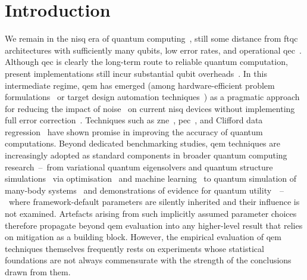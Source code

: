 \documentclass[10pt,conference]{IEEEtran}
\begin{document}
\section{Introduction}
\label{sec:introduction}
We remain in the \gls{nisq} era of quantum computing~\cite{preskill_quantum_2018,felix:23:imperfections,simon:24:noise,bharti:2022}, still some distance from \gls{ftqc} architectures with sufficiently many qubits, low error rates, and operational \gls{qec}~\cite{preskill_fault-tolerant_1997,preskill_beyond_2025}. Although \gls{qec} is clearly the long-term route to reliable quantum computation, present implementations still incur substantial qubit overheads~\cite{beverland_surface_2022,gidney_yoked_2023}. In this intermediate regime, \gls{qem} has emerged (among hardware-efficient problem formulations~\cite{lukas:25:sat,lukas:24:reduction,schmidbauer:2026} or target design automation techniques~\cite{simon:25:designautomation,wille:2024}) as a pragmatic approach for reducing the impact of noise~\cite{stefan:25:noise} on current \gls{nisq} devices without implementing full error correction~\cite{temme_error_2017,li_efficient_2017,endo_practical_2018,cai_quantum_2023}. Techniques such as \gls{zne}~\cite{temme_error_2017,li_efficient_2017}, \gls{pec}~\cite{temme_error_2017,berg_probabilistic_2023}, and Clifford data regression~\cite{czarnik_error_2021} have shown promise in improving the accuracy of quantum computations. Beyond dedicated benchmarking studies, \gls{qem} techniques are increasingly adopted as standard components in broader quantum computing research~--~from variational quantum eigensolvers and quantum structure simulations~\cite{kandala_error_2019,dumitrescu2018cloud} via optimisation~\cite{lukas:26:quadratisation,Lucas2014,tom:25:loop,lukas:25:path,schoenberger:2023} and machine learning~\cite{schuld2015introduction,franz:2024,schuld2021machine,wittek2014quantum} to quantum simulation of many-body systems~\cite{chen2022error} and demonstrations of evidence for quantum utility~\cite{kim_evidence_2023}~--~where framework-default parameters are silently inherited and their influence is not examined. Artefacts arising from such implicitly assumed parameter choices therefore propagate beyond \gls{qem} evaluation into any higher-level result that relies on mitigation as a building block. However, the empirical evaluation of \gls{qem} techniques themselves frequently rests on experiments whose statistical foundations are not always commensurate with the strength of the conclusions drawn from them.
\end{document}
